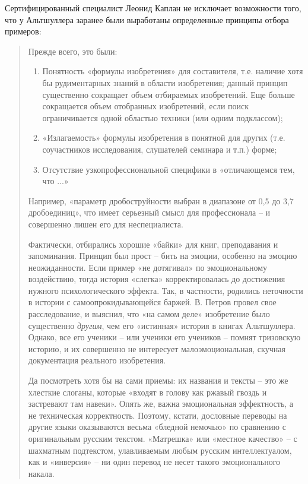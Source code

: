 \documentclass[11pt,a4paper]{article}
\begin{document}
Сертифицированный специалист Леонид Каплан не исключает возможности того, что
у Альтшуллера заранее были выработаны определенные принципы отбора примеров:
\begin{quote}  
   Прежде всего, это были:
   \begin{enumerate}
   \item Понятность «формулы изобретения» для составителя, т.е. наличие хотя
     бы рудиментарных знаний в области изобретения; данный принцип существенно
     сокращает объем отбираемых изобретений. Еще больше сокращается объем
     отобранных изобретений, если поиск ограничивается одной областью техники
     (или одним подклассом);
   \item «Излагаемость» формулы изобретения в понятной для других
     (т.е. соучастников исследования, слушателей семинара и т.п.) форме;
   \item Отсутствие узкопрофессиональной специфики в «отличающемся тем, что
     ...»
   \end{enumerate}
   
  Например, «параметр дробоструйности выбран в диапазоне от 0{,}5 до 3{,}7
  дробоединиц», что имеет серьезный смысл для профессионала -- и совершенно
  лишен его для неспециалиста.

  Фактически, отбирались хорошие «байки» для книг, преподавания и запоминания.
  Принцип был прост -- бить на эмоции, особенно на эмоцию неожиданности. Если
  пример «не дотягивал» по эмоциональному воздействию, тогда история «слегка»
  корректировалась до достижения нужного психологического эффекта. Так, в
  частности, родились неточности в истории с самоопрокидывающейся баржей.
  В. Петров провел свое расследование, и выяснил, что «на самом деле»
  изобретение было существенно \emph{другим}, чем его «истинная» история в
  книгах Альтшуллера. Однако, все его ученики -- или ученики его учеников --
  помнят тризовскую историю, и их совершенно не интересует малоэмоциональная,
  скучная документация реального изобретения.

  Да посмотреть хотя бы на сами приемы: их названия и тексты -- это же
  хлесткие слоганы, которые «входят в голову как ржавый гвоздь и застревают
  там навеки». Опять же, важна эмоциональная эффектность, а не техническая
  корректность. Поэтому, кстати, дословные переводы на другие языки
  оказываются весьма «бледной немочью» по сравнению с оригинальным русским
  текстом. «Матрешка» или «местное качество» -- с шахматным подтекстом,
  улавливаемым любым русским интеллектуалом, как и «инверсия» -- ни один
  перевод не несет такого эмоционального накала.
\end{quote}
\end{document}
